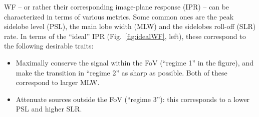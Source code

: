 \documentclass[useAMS,usenatbib]{mn2e}
\begin{document}
WF -- or rather their corresponding image-plane response (IPR) -- can be characterized in terms of various metrics. Some common 
ones are the peak sidelobe level (PSL), the main lobe width (MLW) and the sidelobes roll-off (SLR) rate. In terms of the ``ideal'' 
IPR (Fig.~\ref{fig:idealWF}, left), these correspond to the following desirable traits:

\begin{itemize}
\item Maximally conserve the signal within the FoV (``regime 1'' in the figure), and make the transition in ``regime 2'' as sharp as possible. Both of these correspond to larger MLW.
\item Attenuate sources outside the FoV (``regime 3''): this corresponds to a lower PSL and higher SLR.
\end{itemize}
\end{document}
